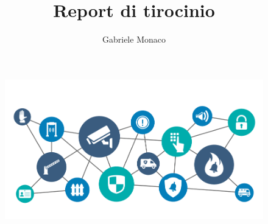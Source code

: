 \documentclass[a4paper,12pt]{article}
\title{Report di tirocinio}
\author{Gabriele Monaco}
\begin{document}
\maketitle

\begin{figure}[h]
  \includegraphics[width=\textwidth]{header}
\end{figure}

\newpage

\tableofcontents

\setlength{\parindent}{0pt}

\newpage
\end{document}
